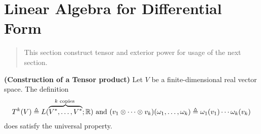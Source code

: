 \documentclass{report}
\begin{document}
\section{Linear Algebra for Differential Form}
\begin{abstract}
This section construct tensor and exterior power for usage of the next section. 
\end{abstract}
\begin{theorem}
\label{CoT}
\textbf{(Construction of a Tensor product)} Let $V$ be a finite-dimensional real vector space. The definition 
 \begin{align*}
   T^k(V)\triangleq L(\overbrace{V^*,\dots ,V^*}^{k\text{ copies }};\mathbb{R})\text{ and }(v_1\otimes \cdots \otimes  v_k)(\omega_1 ,\dots , \omega_k)\triangleq \omega_1(v_1)\cdots \omega_k (v_k)
\end{align*}
does satisfy the universal property.
\end{theorem}
\end{document}
